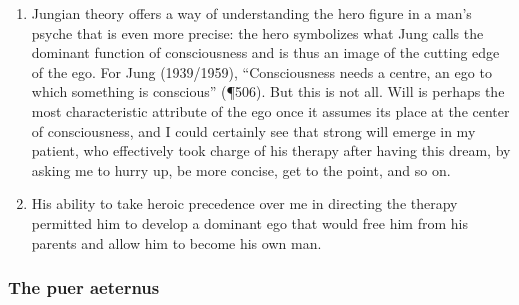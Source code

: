 \begin{enumerate}
    \item {} Jungian theory offers a way of
        understanding the hero figure in a man's psyche that is even more
        precise: the hero symbolizes what Jung calls the dominant function of
        consciousness and is thus an image of the cutting edge of the ego. For
        Jung (1939/1959), ``Consciousness needs a centre, an ego to which
        something is conscious'' (¶506). But this is not all. Will is perhaps
        the most characteristic attribute of the ego once it assumes its place
        at the center of consciousness, and I could certainly see that strong
        will emerge in my patient, who effectively took charge of his therapy
        after having this dream, by asking me to hurry up, be more concise, get
        to the point, and so on.

    \item {} His ability to take heroic
        precedence over me in directing the therapy permitted him to develop a
        dominant ego that would free him from his parents and allow him to
        become his own man.

\end{enumerate}

\subsubsection{The puer aeternus}

